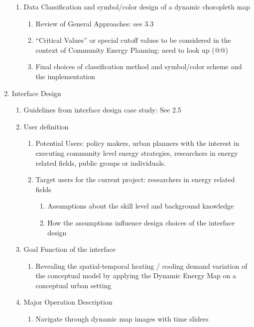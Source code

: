\documentclass[12pt]{article}
\begin{document}
\begin{enumerate}
\begin{enumerate}[label*=\arabic*.]
  \item Data Classification and symbol/color design of a dynamic
    choropleth map
    \begin{enumerate}[label*=\arabic*.]
    \item Review of General Approaches: see 3.3
    \item ``Critical Values'' or special cutoff values to be
      considered in the context of Community Energy Planning: need to
      look up (@@)
    \item Final choices of classification method and symbol/color
      scheme and the implementation
    \end{enumerate}
  \end{enumerate}
\item Interface Design
  \begin{enumerate}[label*=\arabic*.]
  \item Guidelines from interface design case study: See 2.5
  \item User definition
    \begin{enumerate}[label*=\arabic*.]
    \item Potential Users: policy makers, urban planners with the
      interest in executing community level energy strategies,
      researchers in energy related fields, public groups or
      individuals.
    \item Target users for the current project: researchers in energy
      related fields
      \begin{enumerate}[label*=\arabic*.]
      \item Assumptions about the skill level and background knowledge
      \item How the assumptions influence design choices of the
        interface design
      \end{enumerate}
    \end{enumerate}
  \item Goal Function of the interface
    \begin{enumerate}[label*=\arabic*.]
    \item Revealing the spatial-temporal heating / cooling demand
      variation of the conceptual model by applying the Dynamic
      Energy Map on a conceptual urban setting
    \end{enumerate}
  \item Major Operation Description
    \begin{enumerate}[label*=\arabic*.]
    \item Navigate through dynamic map images with time sliders

\end{enumerate}
\end{enumerate}
\end{enumerate}
\end{document}
